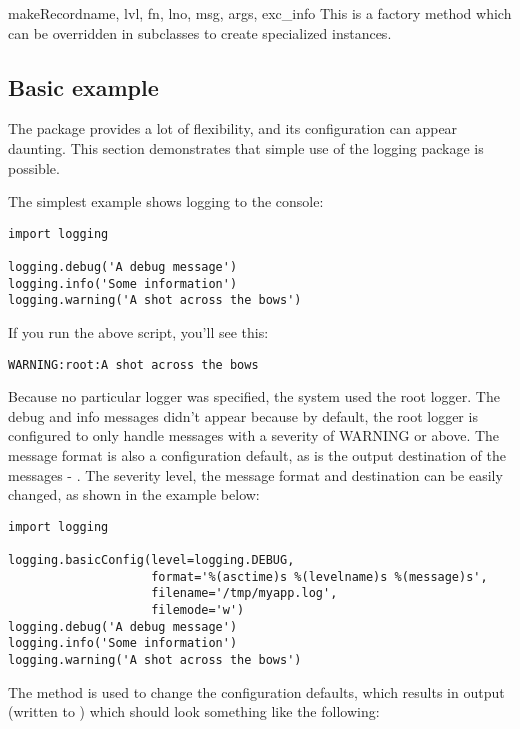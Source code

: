 \begin{methoddesc}{makeRecord}{name, lvl, fn, lno, msg, args, exc_info}
This is a factory method which can be overridden in subclasses to create
specialized  instances.
\end{methoddesc}

\subsection{Basic example \label{minimal-example}}

The  package provides a lot of flexibility, and its
configuration can appear daunting.  This section demonstrates that simple
use of the logging package is possible.

The simplest example shows logging to the console:

\begin{verbatim}
import logging

logging.debug('A debug message')
logging.info('Some information')
logging.warning('A shot across the bows')
\end{verbatim}

If you run the above script, you'll see this:
\begin{verbatim}
WARNING:root:A shot across the bows
\end{verbatim}

Because no particular logger was specified, the system used the root logger.
The debug and info messages didn't appear because by default, the root
logger is configured to only handle messages with a severity of WARNING
or above. The message format is also a configuration default, as is the output
destination of the messages - . The severity level,
the message format and destination can be easily changed, as shown in
the example below:

\begin{verbatim}
import logging

logging.basicConfig(level=logging.DEBUG,
                    format='%(asctime)s %(levelname)s %(message)s',
                    filename='/tmp/myapp.log',
                    filemode='w')
logging.debug('A debug message')
logging.info('Some information')
logging.warning('A shot across the bows')
\end{verbatim}

The  method is used to change the configuration
defaults, which results in output (written to )
which should look something like the following:


